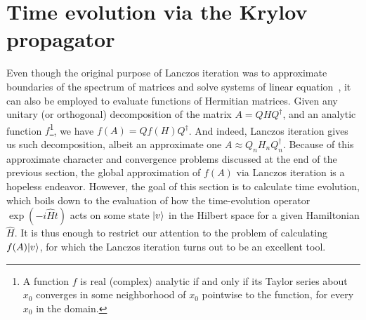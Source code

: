 \section{Time evolution via the Krylov propagator}

Even though the original purpose of Lanczos iteration was to approximate boundaries of the spectrum of matrices and
solve systems of linear equation~\autocite{Simoncini2016, Shewchuk1994a}, it can also be employed to evaluate functions
of Hermitian matrices. Given any unitary (or orthogonal) decomposition of the matrix \(A = QHQ^{\dagger}\), and an analytic
function \(f\)\footnote{A function \(f\) is real (complex) analytic if and only if its Taylor series about \(x_0\) 
converges in some neighborhood of \(x_0\) pointwise to the function, for every \(x_0\) in the domain.}, we have
\(f(A) = Qf(H)Q^{\dagger}\). And indeed, Lanczos iteration gives us such decomposition, albeit an approximate one
\(A \approx Q_n H_n Q_n^{\dagger}\). Because of this approximate character and convergence problems discussed at
the end of the previous section, the global approximation of \(f(A)\) via Lanczos iteration is a hopeless endeavor.
However, the goal of this section is to calculate time evolution, which boils down to the evaluation of how the time-evolution
operator \(\exp\left(-i \hat{H} t\right) \) acts on some state \(\ket{v}\) in the Hilbert space for a given
Hamiltonian \(\hat{H}\). It is thus enough to restrict our attention to the problem of calculating \(f(A){\ket{v}}\), for
which the Lanczos iteration turns out to be an excellent tool.

